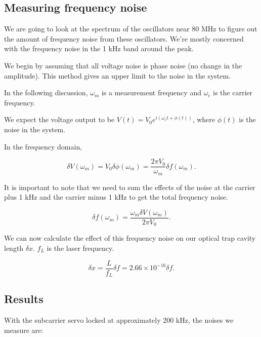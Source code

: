 \subsection{Measuring frequency noise}

We are going to look at the spectrum of the oscillators near 80 MHz to figure out the amount of frequency noise from these oscillators.  We're mostly concerned with the frequency noise in the 1 kHz band around the peak.

We begin by assuming that all voltage noise is phase noise (no change in the amplitude).  This method gives an upper limit to the noise in the system.

In the following discussion, $\omega_m$ is a measurement frequency and $\omega_c$ is the carrier frequency.

We expect the voltage output to be $V(t) = V_0 e^{i(\omega_c t + \phi(t))}$, where $\phi(t)$ is the noise in the system.

In the frequency domain,

\begin{equation}
\delta V(\omega_m) = V_0 \delta \phi(\omega_m) = \frac{2\pi V_0}{\omega_m} \delta f(\omega_m).
\label{eq:VofOmega}
\end{equation}

It is important to note that we need to sum the effects of the noise at the carrier plus 1 kHz and the carrier minus 1 kHz to get the total frequency noise.

\begin{equation}
\delta f(\omega_m)= \frac{\omega_m \delta V(\omega_m)}{2 \pi V_0}.
\label{eq:deltafSCS}
\end{equation}


We can now calculate the effect of this frequency noise on our optical trap cavity length $\delta x$.  $f_L$ is the laser frequency.

\begin{equation}
\delta x = \frac{L}{f_L} \delta f = 2.66\times10^{-16} \delta f.
\label{eq:deltax}
\end{equation}



\subsection{Results}

With the subcarrier servo locked at approximately 200 kHz, the noises we measure are:

